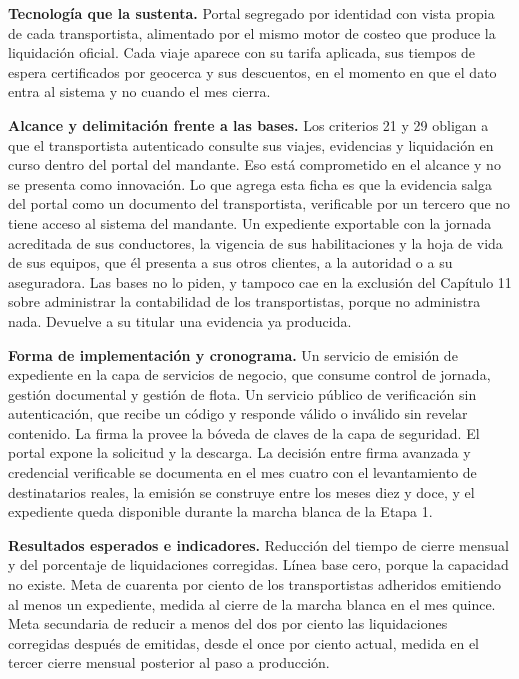 \textbf{Tecnología que la sustenta.} Portal segregado por identidad con vista propia de cada
transportista, alimentado por el mismo motor de costeo que produce la liquidación oficial. Cada
viaje aparece con su tarifa aplicada, sus tiempos de espera certificados por geocerca y sus
descuentos, en el momento en que el dato entra al sistema y no cuando el mes cierra.

\textbf{Alcance y delimitación frente a las bases.} Los criterios 21 y 29 obligan a que el
transportista autenticado consulte sus viajes, evidencias y liquidación en curso dentro del portal
del mandante. Eso está comprometido en el alcance y no se presenta como innovación. Lo que agrega
esta ficha es que la evidencia salga del portal como un documento del transportista, verificable
por un tercero que no tiene acceso al sistema del mandante. Un expediente exportable con la jornada
acreditada de sus conductores, la vigencia de sus habilitaciones y la hoja de vida de sus equipos,
que él presenta a sus otros clientes, a la autoridad o a su aseguradora. Las bases no lo piden, y
tampoco cae en la exclusión del Capítulo 11 sobre administrar la contabilidad de los
transportistas, porque no administra nada. Devuelve a su titular una evidencia ya producida.

\textbf{Forma de implementación y cronograma.} Un servicio de emisión de expediente
en la capa de servicios de negocio, que consume control de jornada, gestión documental y gestión de
flota. Un servicio público de verificación sin autenticación, que recibe un código y responde
válido o inválido sin revelar contenido. La firma la provee la bóveda de claves de la capa de
seguridad. El portal expone la solicitud y la descarga. La decisión entre firma avanzada y
credencial verificable se documenta en el mes cuatro con el levantamiento de destinatarios reales,
la emisión se construye entre los meses diez y doce, y el expediente queda disponible durante la
marcha blanca de la Etapa 1.

\textbf{Resultados esperados e indicadores.} Reducción del tiempo de cierre mensual y del porcentaje de
liquidaciones corregidas. Línea base cero, porque la capacidad no existe. Meta de
cuarenta por ciento de los transportistas adheridos emitiendo al menos un expediente, medida al
cierre de la marcha blanca en el mes quince. Meta secundaria de reducir a menos del dos por ciento
las liquidaciones corregidas después de emitidas, desde el once por ciento actual, medida en el
tercer cierre mensual posterior al paso a producción.

